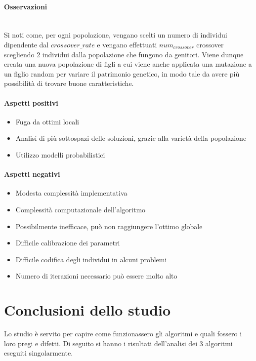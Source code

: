 \noindent \paragraph{Osservazioni}\hfill\\
Si noti come, per ogni popolazione, vengano scelti un numero di individui dipendente dal {$crossover\_rate$}
e vengano effettuati {$num_{crossover}$} crossover scegliendo 2 individui dalla popolazione che fungono da genitori.
Viene dunque creata una nuova popolazione di figli a cui viene anche applicata una mutazione a un figlio random per
variare il patrimonio genetico, in modo tale da avere più possibilità di trovare buone caratteristiche.

\noindent \paragraph{Aspetti positivi}
\begin{itemize}
    \item Fuga da ottimi locali
    \item Analisi di più sottospazi delle soluzioni, grazie alla varietà della popolazione
    \item Utilizzo modelli probabilistici
\end{itemize}

\noindent \paragraph{Aspetti negativi}
\begin{itemize}
    \item Modesta complessità implementativa
    \item Complessità computazionale dell'algoritmo
    \item Possibilmente inefficace, può non raggiungere l'ottimo globale
    \item Difficile calibrazione dei parametri
    \item Difficile codifica degli individui in alcuni problemi
    \item Numero di iterazioni necessario può essere molto alto
\end{itemize}
\newpage
\section{Conclusioni dello studio}
\label{conclusione-studio-fattibilita}
\noindent Lo studio è servito per capire come funzionassero gli algoritmi e quali fossero i loro pregi e difetti.
Di seguito si hanno i risultati dell'analisi dei 3 algoritmi eseguiti singolarmente.\\

